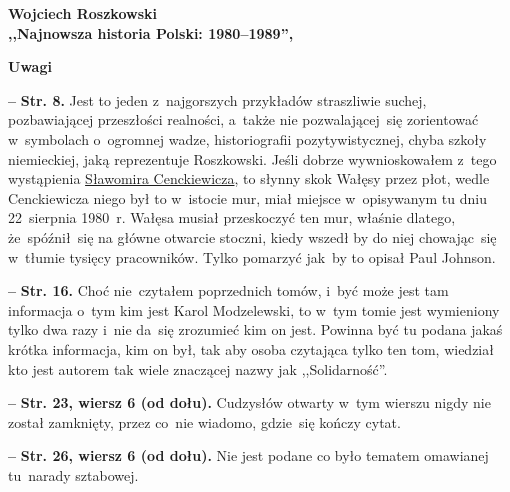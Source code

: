 \documentclass[a4paper,11pt]{article}
\newcommand{\spaceTwo}{2em}
\newcommand{\spaceFour}{0.5em}
\newcommand{\tb}{\textbf}
\newcommand{\noi}{\noindent}
\newcommand{\start}{\noi \tb{--} {}}
\newcommand{\Center}[1]{\begin{center} #1 \end{center}}
\newcommand{\CenterTB}[1]{\Center{\tb{#1}}}
\newcommand{\Str}[1]{\tb{Str. #1.}}
\newcommand{\StrWd}[2]{\tb{Str. #1, wiersz #2 (od dołu).}}
\newcommand{\Work}[1]{ \begin{center} {\large \tb{#1}} \end{center} }
\begin{document}
\vspace{\spaceTwo}





\Work{
  Wojciech Roszkowski \\
  ,,Najnowsza historia Polski: 1980--1989'',
  \cite{RoszkowskiNajnowszaHistoriaPolski80-89Wyd11} }


\CenterTB{Uwagi}

\start \Str{8} Jest to jeden z~najgorszych przykładów straszliwie
suchej, pozbawiającej przeszłości realności, a~także nie
pozwalającej~się zorientować w~symbolach o~ogromnej wadze,
historiografii pozytywistycznej, chyba szkoły niemieckiej, jaką
reprezentuje Roszkowski. Jeśli dobrze wywnioskowałem z~tego
wystąpienia
\href{https://www.youtube.com/watch?v=6B93_3CCMac}{Sławomira
  Cenckiewicza}, to słynny skok Wałęsy przez płot, wedle Cenckiewicza
niego był to w~istocie mur, miał miejsce w~opisywanym tu dniu
22~sierpnia 1980~r. Wałęsa musiał przeskoczyć ten mur, właśnie
dlatego, że~spóźnił~się na główne otwarcie stoczni, kiedy wszedł by do
niej chowając~się w~tłumie tysięcy pracowników. Tylko pomarzyć jak~by
to opisał Paul Johnson.

\vspace{\spaceFour}


\start \Str{16} Choć nie~czytałem poprzednich tomów, i~być może jest
tam informacja o~tym kim jest Karol Modzelewski, to w~tym tomie jest
wymieniony tylko dwa razy i~nie da~się zrozumieć kim on jest. Powinna
być tu podana jakaś krótka informacja, kim on był, tak aby osoba
czytająca tylko ten tom, wiedział kto jest autorem tak wiele znaczącej
nazwy jak ,,Solidarność''.

\vspace{\spaceFour}


\start \StrWd{23}{6} Cudzysłów otwarty w~tym wierszu nigdy nie został
zamknięty, przez co~nie wiadomo, gdzie~się kończy cytat.

\vspace{\spaceFour}


\start \StrWd{26}{6} Nie jest podane co było tematem omawianej
tu~narady sztabowej.


\end{document}
